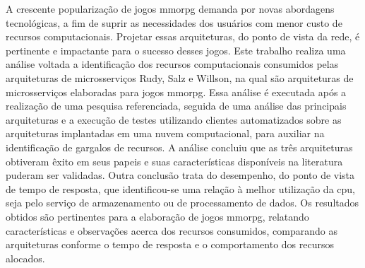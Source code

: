 A crescente popularização de jogos \acf{mmorpg} demanda por novas abordagens tecnológicas, a fim de suprir as necessidades dos usuários com menor custo de recursos computacionais.
%
Projetar essas arquiteturas, do ponto de vista da rede, é pertinente e impactante para o sucesso desses jogos.
%
Este trabalho realiza uma análise voltada a identificação dos recursos computacionais consumidos pelas arquiteturas de microsserviços Rudy, Salz e Willson, na qual são arquiteturas de microsserviços elaboradas para jogos \ac{mmorpg}.
%
Essa análise é executada após a realização de uma pesquisa referenciada, seguida de uma análise das principais arquiteturas e a execução de testes utilizando clientes automatizados sobre as arquiteturas implantadas em uma nuvem computacional, para auxiliar na identificação de gargalos de recursos.
%
A análise concluiu que as três arquiteturas obtiveram êxito em seus papeis e suas características disponíveis na literatura puderam ser validadas.
%
Outra conclusão trata do desempenho, do ponto de vista de tempo de resposta, que identificou-se uma relação à melhor utilização da \ac{cpu}, seja pelo serviço de armazenamento ou de processamento de dados.
%
Os resultados obtidos são pertinentes para a elaboração de jogos \ac{mmorpg}, relatando características e observações acerca dos recursos consumidos, comparando as arquiteturas conforme o tempo de resposta e o comportamento dos recursos alocados.
